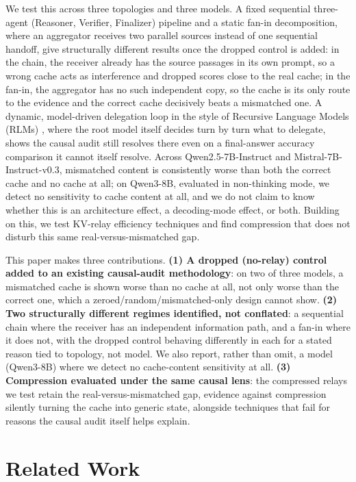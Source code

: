 \documentclass[11pt]{article}
\begin{document}
We test this across three topologies and three models. A fixed
sequential three-agent (Reasoner, Verifier, Finalizer) pipeline and a
static fan-in decomposition, where an aggregator receives two parallel
sources instead of one sequential handoff, give structurally different
results once the dropped control is added: in the chain, the receiver
already has the source passages in its own prompt, so a wrong cache
acts as interference and dropped scores close to the real cache; in
the fan-in, the aggregator has no such independent copy, so the cache
is its only route to the evidence and the correct cache decisively
beats a mismatched one. A dynamic, model-driven delegation loop in the
style of Recursive Language Models (RLMs) \citep{rlm2026}, where the
root model itself decides turn by turn what to delegate, shows the
causal audit still resolves there even on a final-answer accuracy
comparison it cannot itself resolve. Across Qwen2.5-7B-Instruct and
Mistral-7B-Instruct-v0.3, mismatched content is consistently worse than
both the correct cache and no cache at all; on Qwen3-8B, evaluated in
non-thinking mode, we detect no sensitivity to cache content at all,
and we do not claim to know whether this is an architecture effect, a
decoding-mode effect, or both. Building on this, we test KV-relay
efficiency techniques and find compression that does not disturb this
same real-versus-mismatched gap.

This paper makes three contributions. \textbf{(1) A dropped (no-relay)
control added to an existing causal-audit methodology}: on two of three
models, a mismatched cache is shown worse than no cache at all, not
only worse than the correct one, which a zeroed/random/mismatched-only
design cannot show. \textbf{(2) Two structurally different regimes
identified, not conflated}: a sequential chain where the receiver has
an independent information path, and a fan-in where it does not, with
the dropped control behaving differently in each for a stated reason
tied to topology, not model. We also report, rather than omit, a model
(Qwen3-8B) where we detect no cache-content sensitivity at all.
\textbf{(3) Compression evaluated under the same causal lens}: the
compressed relays we test retain the real-versus-mismatched gap,
evidence against compression silently turning the cache into generic
state, alongside techniques that fail for reasons the causal audit
itself helps explain.

\section{Related Work}
\label{sec:related}
\end{document}
